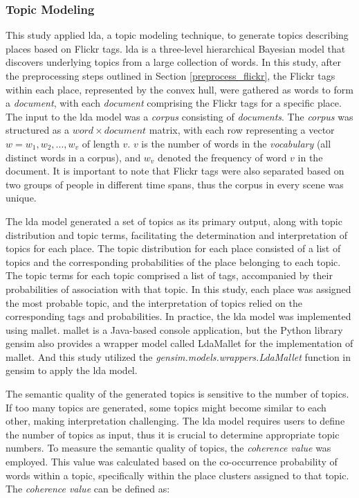 \documentclass{article}
\theoremstyle{definition}
\theoremstyle{remark}
\begin{document}
\subsubsection{Topic Modeling}
This study applied \acrfull{lda}, a topic modeling technique, to generate topics describing places based on Flickr tags. \acrshort{lda} is a three-level hierarchical Bayesian model that discovers underlying topics from a large collection of words. In this study, after the preprocessing steps outlined in Section \ref{preprocess_flickr}, the Flickr tags within each place, represented by the convex hull, were gathered as words to form a \textit{document}, with each \textit{document} comprising the Flickr tags for a specific place. The input to the \acrshort{lda} model was a \textit{corpus} consisting of \textit{documents}. The \textit{corpus} was structured as a $word \times document$ matrix, with each row representing a vector $w = {w_{1}, w_{2}, ..., w_{v}}$ of length $v$. $v$ is the number of words in the \textit{vocabulary} (all distinct words in a corpus), and $w_{v}$ denoted the frequency of word $v$ in the document. It is important to note that Flickr tags were also separated based on two groups of people in different time spans, thus the corpus in every scene was unique.

The \acrshort{lda} model generated a set of topics as its primary output, along with topic distribution and topic terms, facilitating the determination and interpretation of topics for each place. The topic distribution for each place consisted of a list of topics and the corresponding probabilities of the place belonging to each topic. The topic terms for each topic comprised a list of tags, accompanied by their probabilities of association with that topic. In this study, each place was assigned the most probable topic, and the interpretation of topics relied on the corresponding tags and probabilities. In practice, the \acrshort{lda} model was implemented using \acrfull{mallet}. \acrshort{mallet} is a Java-based console application, but the Python library gensim \citep{rehurek_software_2010} also provides a wrapper model called LdaMallet for the implementation of \acrshort{mallet}. And this study utilized the \textit{gensim.models.wrappers.LdaMallet} function in gensim to apply the \acrshort{lda} model.

The semantic quality of the generated topics is sensitive to the number of topics. If too many topics are generated, some topics might become similar to each other, making interpretation challenging. The \acrshort{lda} model requires users to define the number of topics as input, thus it is crucial to determine appropriate topic numbers. To measure the semantic quality of topics, the \textit{coherence value} was employed. This value was calculated based on the co-occurrence probability of words within a topic, specifically within the place clusters assigned to that topic. The \textit{coherence value} can be defined as:
\end{document}
